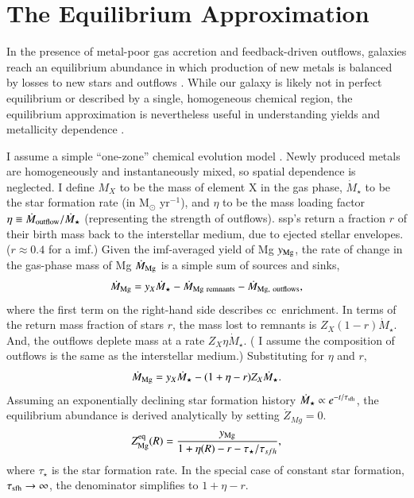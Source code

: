 \documentclass[12pt,oneside,letterpaper]{report}
\newcommand{\cc}{\gls{cc}}
\newcommand{\ssp}{\gls{ssp}}
\newcommand{\imf}{\gls{imf}}
\begin{document}
\chapter{The Equilibrium Approximation}\label{sec:equilibrium}

In the presence of metal-poor gas accretion and feedback-driven outflows, galaxies reach an equilibrium abundance in which production of new metals is balanced by losses to new stars and outflows \citep{larson72, dalcanton07, FD08, PS11, lilly13}.
While our galaxy is likely not in perfect equilibrium or described by a single, homogeneous chemical region, the equilibrium approximation is nevertheless useful in understanding yields and metallicity dependence \citep[e.g.][]{james_dwarf,james+23,WAF17}. 

I assume a simple ``one-zone'' chemical evolution model \cite[e.g.][]{tinsley80, pagel09, matteucci21}.  Newly produced metals are homogeneously and instantaneously mixed, so spatial dependence is neglected.
I define $M_{X}$ to be the mass of element X in the gas phase, $\dot{M}_\star$ to be the star formation rate (in M$_\odot$ yr$^{-1}$), and $\eta$ to be the mass loading factor $\eta\equiv\dot{M}_{\rm outflow}/\dot{M}_\star$ (representing the strength of outflows). \ssp's return a fraction $r$ of their birth mass back to the interstellar medium, due to ejected stellar envelopes. ($r\approx0.4$ for a \citealt{kroupa01} \imf.)
Given the \imf-averaged yield of Mg $y_{\rm Mg}$, the rate of change in the gas-phase mass of Mg $\dot{M}_{\rm Mg}$ is a simple sum of sources and sinks,
\begin{equation}
    \dot{M}_{\rm Mg} =  y_{X}\dot{M}_\star - \dot{M}_{\rm Mg~remnants} - \dot{M}_{\rm Mg,~outflows},
\end{equation}
where the first term on the right-hand side describes \cc\ enrichment. 
In terms of the return mass fraction of stars $r$, the mass lost to remnants is $Z_X (1-r)\dot{M}_\star$.  And, the outflows deplete mass at a rate $Z_X \eta\dot{M}_\star$. ( I assume the composition of outflows is the same as the interstellar medium.) Substituting for $\eta$ and $r$,  
\begin{equation}
    \dot{M}_{\rm Mg}= y_{X} \dot{M}_\star - (1 + \eta - r) Z_{X} \dot{M}_\star.
\end{equation}
Assuming an exponentially declining star formation history $\dot{M}_\star \propto e^{-t/\tau_{\rm sfh}}$, the equilibrium abundance is derived analytically by setting $\dot{Z}_{Mg}=0$.
\begin{equation}\label{eq:z_eq}
    Z_{\rm Mg}^{\rm eq}(R) = \frac{y_{\rm Mg}}{1 + \eta(R) - r - \tau_\star / \tau_{sfh}},
\end{equation}
where $\tau_{\star}$ is the star formation rate.
In the special case of constant star formation, $\tau_{\rm sfh}\to\infty$, the denominator simplifies to $1+\eta-r$.
\end{document}
